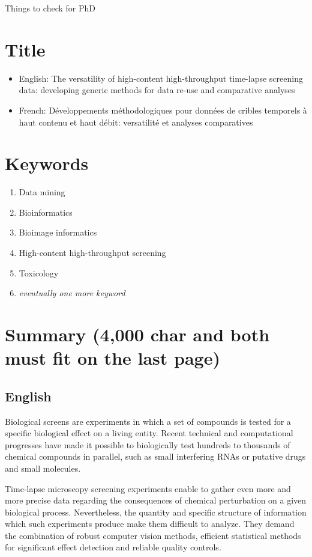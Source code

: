 \documentclass[12pt]{article}
\begin{document}
Things to check for PhD
\section{Title}
\begin{itemize}
\item English: The versatility of high-content high-throughput time-lapse screening data: developing generic methods for data re-use and comparative analyses
\item French: Développements méthodologiques pour données de cribles temporels à haut contenu et haut débit: versatilité et analyses comparatives
\end{itemize}
\section{Keywords}
\begin{enumerate}
\item Data mining
\item Bioinformatics
\item Bioimage informatics
\item High-content high-throughput screening
\item Toxicology
\item \textit{eventually one more keyword}
\end{enumerate}


\section{Summary (4,000 char and both must fit on the last page)}
\subsection{English}
Biological screens are experiments in which a set of compounds is tested for a specific biological effect on a living entity. Recent technical and computational progresses have made it possible to biologically test hundreds to thousands of chemical compounds in parallel, such as small interfering RNAs or putative drugs and small molecules.

Time-lapse microscopy screening experiments enable to gather even more and more precise data regarding the consequences of chemical perturbation on a given biological process. Nevertheless, the quantity and specific structure of information which such experiments produce make them difficult to analyze. They demand the combination of robust computer vision methods, efficient statistical methods for significant effect detection and reliable quality controls.
\end{document}
